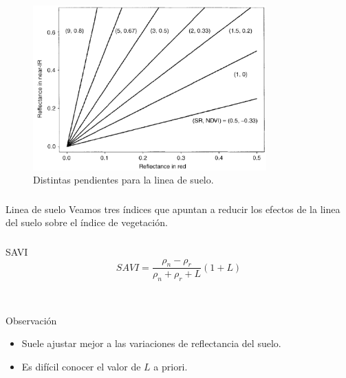 \documentclass[]{beamer}
\begin{document}
\begin{frame}
    \frametitle{\subsecname}
    \begin{figure}
    \begin{center}
        \includegraphics[width=0.8\textwidth]{imagenes/soiline.png}
    \end{center}
        \caption{Distintas pendientes para la linea de
        suelo.}
    \end{figure}
\end{frame}

\begin{frame}
    \frametitle{\subsecname}
    \begin{block}{Linea de suelo}
        Veamos tres índices que apuntan a reducir los efectos de la linea del
        suelo sobre el índice de vegetación.
    \end{block}
\end{frame}

\begin{frame}
    \frametitle{\subsecname}
    \begin{block}{SAVI}
        \begin{equation}
            SAVI = \frac{\rho_n-\rho_r}{\rho_n+\rho_r+L}(1+L)
        \end{equation}
    \end{block}\pause\
    \begin{block}{Observación}
        \begin{itemize}[<+->]
            \item Suele ajustar mejor a las variaciones de reflectancia del
                suelo.
            \item Es difícil conocer el valor de $L$ a priori.
        \end{itemize}
    \end{block}
\end{frame}
\end{document}

